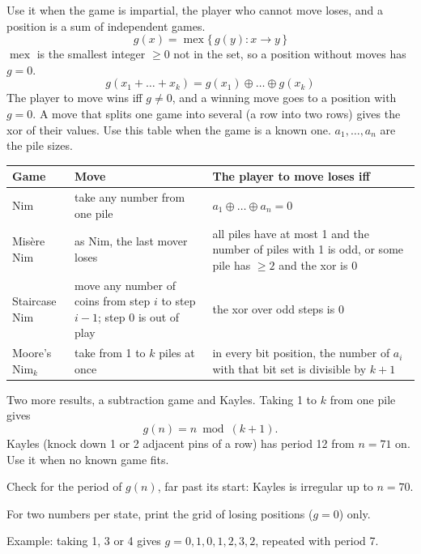 {\footnotesize\tightdisplay
{}
Use it when the game is impartial, the player who cannot move loses, and a position is a sum of independent games.
\[ g(x) = \operatorname{mex} \{\, g(y) : x \to y \,\} \]
$\operatorname{mex}$ is the smallest integer $\ge 0$ not in the set, so a position without moves has $g = 0$.
\[ g(x_1 + \dots + x_k) = g(x_1) \oplus \dots \oplus g(x_k) \]
The player to move wins iff $g \ne 0$, and a winning move goes to a position with $g = 0$.
A move that splits one game into several (a row into two rows) gives the xor of their values.
Use this table when the game is a known one. $a_1, \dots, a_n$ are the pile sizes.
\par\smallskip
\begin{tabular}{@{}p{1.6cm} p{3.1cm} p{3.7cm}@{}}
\toprule
Game & Move & The player to move loses iff \\
\midrule
Nim & take any number from one pile & $a_1 \oplus \dots \oplus a_n = 0$ \\
Misère Nim & as Nim, the last mover loses & all piles have at most 1 and the number of piles with 1 is odd, or some pile has $\ge 2$ and the xor is 0 \\
Staircase Nim & move any number of coins from step $i$ to step $i - 1$; step 0 is out of play & the xor over odd steps is 0 \\
Moore's $\text{Nim}_k$ & take from 1 to $k$ piles at once & in every bit position, the number of $a_i$ with that bit set is divisible by $k + 1$ \\
\bottomrule
\end{tabular}
\par\smallskip
Two more results, a subtraction game and Kayles. Taking 1 to $k$ from one pile gives
\[ g(n) = n \bmod (k + 1). \]
Kayles (knock down 1 or 2 adjacent pins of a row) has period 12 from $n = 71$ on.
Use it when no known game fits.
\begin{facts}
	\item Check for the period of $g(n)$, far past its start: Kayles is irregular up to $n = 70$.
	\item For two numbers per state, print the grid of losing positions ($g = 0$) only.
\end{facts}
Example: taking 1, 3 or 4 gives $g = 0, 1, 0, 1, 2, 3, 2$, repeated with period 7.
}
